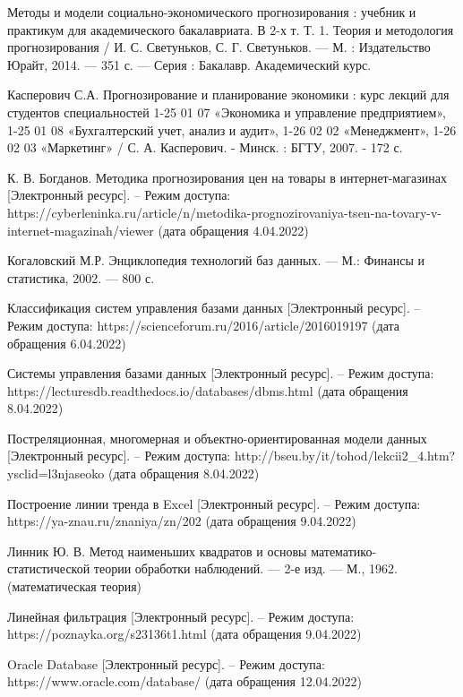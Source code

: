 \documentclass{bmstu}
\begin{document}
\begin{thebibliography}{3}
	 Методы и модели социально-экономического прогнозирования : учебник и практикум для академического бакалавриата. В 2-х т. Т. 1. Теория и методология прогнозирования / И. С. Светуньков, С. Г. Светуньков. — М. : Издательство Юрайт, 2014. — 351 с. — Серия : Бакалавр. Академический курс.
	
	 Касперович С.А. Прогнозирование и планирование экономики : курс лекций для студентов специальностей 1-25 01 07 «Экономика и управление предприятием», 1-25 01 08 «Бухгалтерский учет, анализ и аудит», 1-26 02 02 «Менеджмент», 1-26 02 03 «Маркетинг» / С. А. Касперович. - Минск. : БГТУ, 2007. - 172 с. 
	
	 К. В. Богданов. Методика прогнозирования цен на товары в интернет-магазинах [Электронный ресурс]. -- Режим доступа: https://cyberleninka.ru/article/n/metodika-prognozirovaniya-tsen-na-tovary-v-internet-magazinah/viewer (дата обращения 4.04.2022)
	
	 Когаловский М.Р. Энциклопедия технологий баз данных. — М.: Финансы и статистика, 2002. — 800 с.
	
	 Классификация систем управления базами данных [Электронный ресурс]. -- Режим доступа: https://scienceforum.ru/2016/article/2016019197 (дата обращения 6.04.2022)
	
	 Системы управления базами данных [Электронный ресурс]. -- Режим доступа: https://lecturesdb.readthedocs.io/databases/dbms.html (дата обращения 8.04.2022)
	
	 Постреляционная, многомерная и объектно-ориентированная модели данных [Электронный ресурс]. -- Режим доступа:  http://bseu.by/it/tohod/lekcii2\_4.htm?ysclid=l3njaseoko (дата обращения 8.04.2022)
	
	 Построение линии тренда в Excel [Электронный ресурс]. -- Режим доступа: https://ya-znau.ru/znaniya/zn/202 (дата обращения 9.04.2022)
	
	 Линник Ю. В. Метод наименьших квадратов и основы математико-статистической теории обработки наблюдений. — 2-е изд. — М., 1962. (математическая теория)
	
	 Линейная фильтрация [Электронный ресурс]. -- Режим доступа: https://poznayka.org/s23136t1.html (дата обращения 9.04.2022)
	
	 Oracle Database [Электронный ресурс]. -- Режим доступа: https://www.oracle.com/database/ (дата обращения 12.04.2022)
	

\end{thebibliography}
\end{document}
